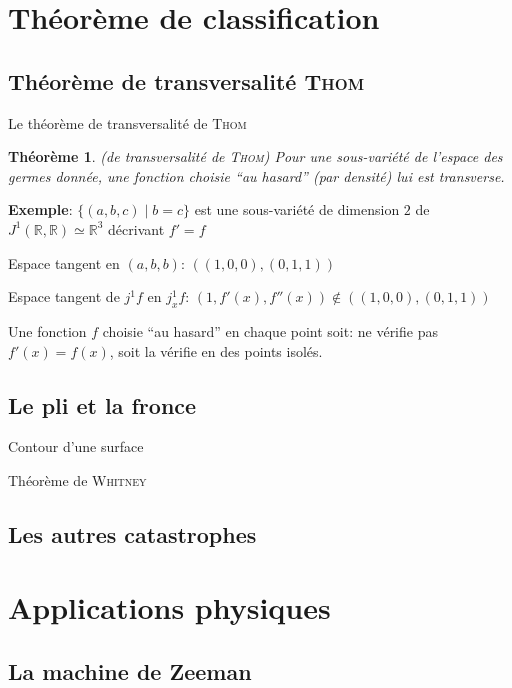 \documentclass[compress]{beamer}
\newcommand{\R}{\mathbb{R}}
\newtheorem{thm}{Théorème}
\theoremstyle{definition}
\begin{document}
\section{Théorème de classification}
\subsection{Théorème de transversalité \textsc{Thom}}
\begin{frame}{Le théorème de transversalité de \textsc{Thom}}
    \begin{thm}{(de transversalité de \textsc{Thom})}
        Pour une sous-variété de l'espace des germes donnée, une fonction choisie ``au hasard'' (par densité) lui est transverse.
    \end{thm}
    \pause
    \textbf{Exemple}: $\{(a,b,c) \mid b=c \}$ est une sous-variété de dimension $2$ de $J^1(\R,\R) \simeq \R^3$ décrivant $f'=f$

    Espace tangent en $(a,b,b)$: $\left((1,0,0), (0,1,1)\right)$

    Espace tangent de $j^1f$ en $j^1_xf$: $(1,f'(x),f''(x))\notin\left((1,0,0), (0,1,1)\right)$

    Une fonction $f$ choisie ``au hasard'' en chaque point soit: ne vérifie pas $f'(x)=f(x)$, soit la vérifie en des points isolés.
\end{frame}

\subsection{Le pli et la fronce}
\begin{frame}{Contour d'une surface}
\end{frame}
\begin{frame}{Théorème de \textsc{Whitney}}
\end{frame}

\subsection{Les autres catastrophes}

\section{Applications physiques}
\subsection{La machine de Zeeman}
\end{document}
